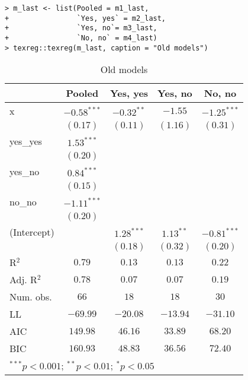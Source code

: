 \documentclass[a4paper]{article}\usepackage[]{graphicx}\usepackage[]{xcolor}
\makeatletter
\newenvironment{kframe}{%
 \def\at@end@of@kframe{}%
 \ifinner\ifhmode%
  \def\at@end@of@kframe{\end{minipage}}%
  \begin{minipage}{\columnwidth}%
 \fi\fi%
 \def\FrameCommand##1{\hskip\@totalleftmargin \hskip-\fboxsep
 \colorbox{shadecolor}{##1}\hskip-\fboxsep
     \hskip-\linewidth \hskip-\@totalleftmargin \hskip\columnwidth}%
 \MakeFramed {\advance\hsize-\width
   \@totalleftmargin\z@ \linewidth\hsize
   \@setminipage}}%
 {\par\unskip\endMakeFramed%
 \at@end@of@kframe}
\makeatother
\begin{document}
\begin{kframe}
\begin{verbatim}
> m_last <- list(Pooled = m1_last,
+                `Yes, yes` = m2_last,
+                `Yes, no`= m3_last,
+                `No, no` = m4_last)
> texreg::texreg(m_last, caption = "Old models")
\end{verbatim}
\end{kframe}
\begin{table}
\begin{center}
\begin{tabular}{l c c c c}
\hline
 & Pooled & Yes, yes & Yes, no & No, no \\
\hline
x           & $-0.58^{***}$ & $-0.32^{**}$ & $-1.55$     & $-1.25^{***}$ \\
            & $(0.17)$      & $(0.11)$     & $(1.16)$    & $(0.31)$      \\
yes\_yes    & $1.53^{***}$  &              &             &               \\
            & $(0.20)$      &              &             &               \\
yes\_no     & $0.84^{***}$  &              &             &               \\
            & $(0.15)$      &              &             &               \\
no\_no      & $-1.11^{***}$ &              &             &               \\
            & $(0.20)$      &              &             &               \\
(Intercept) &               & $1.28^{***}$ & $1.13^{**}$ & $-0.81^{***}$ \\
            &               & $(0.18)$     & $(0.32)$    & $(0.20)$      \\
\hline
R$^2$       & $0.79$        & $0.13$       & $0.13$      & $0.22$        \\
Adj. R$^2$  & $0.78$        & $0.07$       & $0.07$      & $0.19$        \\
Num. obs.   & $66$          & $18$         & $18$        & $30$          \\
LL          & $-69.99$      & $-20.08$     & $-13.94$    & $-31.10$      \\
AIC         & $149.98$      & $46.16$      & $33.89$     & $68.20$       \\
BIC         & $160.93$      & $48.83$      & $36.56$     & $72.40$       \\
\hline
\multicolumn{5}{l}{\scriptsize{$^{***}p<0.001$; $^{**}p<0.01$; $^{*}p<0.05$}}
\end{tabular}
\caption{Old models}
\label{table:coefficients}
\end{center}
\end{table}
\end{document}
